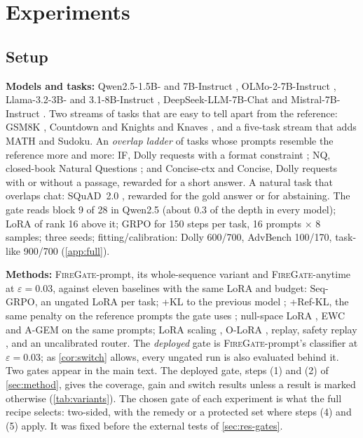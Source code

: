 \documentclass{article}
\theoremstyle{plain}
\theoremstyle{definition}
\theoremstyle{remark}
\newcommand{\methodp}{\textsc{FireGate}-prompt}
\newcommand{\methoda}{\textsc{FireGate}-anytime}
\begin{document}
\section{Experiments}
\label{sec:experiments}

\subsection{Setup}
\label{sec:setup-main}

\textbf{Models and tasks:} Qwen2.5-1.5B- and 7B-Instruct \citep{qwen2025qwen25}, OLMo-2-7B-Instruct
\citep{olmo2024olmo2}, Llama-3.2-3B- and 3.1-8B-Instruct \citep{grattafiori2024llama3}, DeepSeek-LLM-7B-Chat
\citep{bi2024deepseekllm} and Mistral-7B-Instruct \citep{jiang2023mistral}. Two streams of tasks that are easy to tell
apart from the reference: GSM8K \citep{cobbe2021gsm8k}, Countdown \citep{pan2025tinyzero} and Knights and Knaves
\citep{xie2024kk,xie2025logicrl}, and a five-task stream that adds MATH \citep{hendrycks2021math} and Sudoku. An
\emph{overlap ladder} of tasks whose prompts resemble the reference more and more: IF, Dolly requests with a
format constraint \citep{zhou2023ifeval}; NQ, closed-book Natural Questions
\citep{kwiatkowski2019nq,lee2019latent}; and Concise-ctx and Concise, Dolly requests with or without a
passage, rewarded for a short answer. A natural task that overlaps chat: SQuAD~2.0 \citep{rajpurkar2018squad2},
rewarded for the gold answer or for abstaining. The gate reads block 9 of 28 in Qwen2.5 (about 0.3 of the
depth in every model); LoRA of rank 16 above it; GRPO for 150 steps per task, 16 prompts $\times$ 8 samples; three
seeds; fitting/calibration: Dolly 600/700, AdvBench 100/170, task-like 900/700 (\cref{app:full}).

\textbf{Methods:} \methodp{}, its whole-sequence variant and \methoda{} at $\varepsilon=0.03$, against eleven baselines
with the same LoRA and budget: Seq-GRPO, an ungated LoRA per task; +KL to the previous model
\citep{shenfeld2026razor}; +Ref-KL, the same penalty on the reference prompts the gate uses \citep{li2018lwf};
null-space LoRA \citep{liang2024inflora}, EWC \citep{kirkpatrick2017ewc} and A-GEM \citep{chaudhry2019agem} on the same
prompts; LoRA scaling \citep{wortsman2022robust}, O-LoRA \citep{wang2023olora}, replay, safety replay
\citep{pham2025preventing}, and an uncalibrated router. The \emph{deployed} gate is \methodp{}'s classifier at
$\varepsilon=0.03$; as \cref{cor:switch} allows, every ungated run is also evaluated behind it. Two gates appear in
the main text. The deployed gate, steps (1) and (2) of \cref{sec:method}, gives the coverage, gain and switch results
unless a result is marked otherwise (\cref{tab:variants}). The chosen gate of each experiment is what the full recipe selects: two-sided,
with the remedy or a protected set where steps (4) and (5) apply. It was fixed before the external tests of
\cref{sec:res-gates}.
\end{document}
